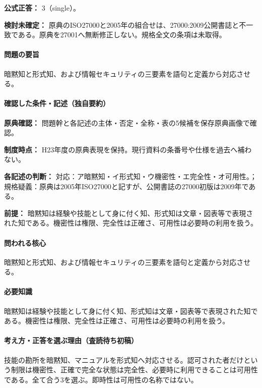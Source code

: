 \textbf{公式正答：} 3（single）。

\par\textbf{検討未確定：} 原典のISO27000と2005年の組合せは、27000:2009公開書誌と不一致である。原典を27001へ無断修正しない。規格全文の条項は未取得。

\paragraph{問題の要旨} 暗黙知と形式知、および情報セキュリティの三要素を語句と定義から対応させる。

\paragraph{確認した条件・記述（独自要約）}\mbox{}\par

\noindent\textbf{原典確認：} 問題幹と各記述の主体・否定・全称・表の5候補を保存原典画像で確認。\par

\noindent\textbf{制度時点：} H23年度の原典表現を保持。現行資料の条番号や仕様を過去へ補わない。\par

\noindent\textbf{各記述の判断：} 対応：ア暗黙知・イ形式知・ウ機密性・エ完全性・オ可用性。；規格疑義：原典は2005年ISO27000と記すが、公開書誌の27000初版は2009年である。\par

\noindent\textbf{前提：} 暗黙知は経験や技能として身に付く知、形式知は文章・図表等で表現された知である。機密性は権限、完全性は正確さ、可用性は必要時の利用を扱う。\par

\paragraph{問われる核心} 暗黙知と形式知、および情報セキュリティの三要素を語句と定義から対応させる。

\paragraph{必要知識} 暗黙知は経験や技能として身に付く知、形式知は文章・図表等で表現された知である。機密性は権限、完全性は正確さ、可用性は必要時の利用を扱う。

\paragraph{考え方・正答を選ぶ理由（査読待ち初稿）} 技能の勘所を暗黙知、マニュアルを形式知へ対応させる。認可された者だけという制限は機密性、正確で完全な状態は完全性、必要時に利用できることは可用性である。全て合う3を選ぶ。即時性は可用性の名称ではない。


